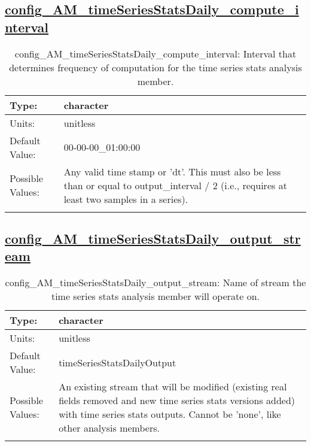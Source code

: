 \subsection[config\_AM\_timeSeriesStatsDaily\_compute\_interval]{\hyperref[sec:nm_tab_AM_timeSeriesStatsDaily]{config\_AM\_timeSeriesStatsDaily\_compute\_interval}}
\label{subsec:nm_sec_config_AM_timeSeriesStatsDaily_compute_interval}
\begin{center}
\begin{longtable}{| p{2.0in} || p{4.0in} |}
    \hline
    Type: & character \\
    \hline
    Units: & \si{unitless} \\
    \hline
    Default Value: & 00-00-00\_01:00:00 \\
    \hline
    Possible Values: & Any valid time stamp or 'dt'. This must also be less than or equal to output\_interval / 2 (i.e., requires at least two samples in a series). \\
    \hline
    \caption{config\_AM\_timeSeriesStatsDaily\_compute\_interval: Interval that determines frequency of computation for the time series stats analysis member.}
\end{longtable}
\end{center}
\subsection[config\_AM\_timeSeriesStatsDaily\_output\_stream]{\hyperref[sec:nm_tab_AM_timeSeriesStatsDaily]{config\_AM\_timeSeriesStatsDaily\_output\_stream}}
\label{subsec:nm_sec_config_AM_timeSeriesStatsDaily_output_stream}
\begin{center}
\begin{longtable}{| p{2.0in} || p{4.0in} |}
    \hline
    Type: & character \\
    \hline
    Units: & \si{unitless} \\
    \hline
    Default Value: & timeSeriesStatsDailyOutput \\
    \hline
    Possible Values: & An existing stream that will be modified (existing real fields removed and new time series stats versions added) with time series stats outputs. Cannot be 'none', like other analysis members. \\
    \hline
    \caption{config\_AM\_timeSeriesStatsDaily\_output\_stream: Name of stream the time series stats analysis member will operate on.}
\end{longtable}
\end{center}
